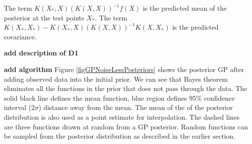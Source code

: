 The term $K(X_{*}, X)( K(X, X) )^{-1}f(X)$ is the predicted mean of the posterior at the test points $X_{*}$. The term $K(X_{*}, X_{*}) - K(X_{*}, X)( K(X, X) )^{-1} K(X, X_{*})$ is the predicted covariance. 

\begin{mdframed}[hidealllines=true,backgroundcolor=lightgray!20]
\textbf{add description of D1}

\textbf{add algorithm}
Figure \ref{figGPNoiseLessPosteriors} shows the posterior GP after adding observed data into the initial prior. We can see that Bayes theorem eliminates all the functions in the prior that does not pass through the data. The solid black line defines the mean function, blue region defines 95\% confidence interval (2$\sigma$) distance away from the mean. The mean of the of the posterior distribution is also used as a point estimate for interpolation. The dashed lines are three functions drawn at random from a GP posterior. Random functions can be sampled from the posterior distribution as described in the earlier section. 
\end{mdframed}


